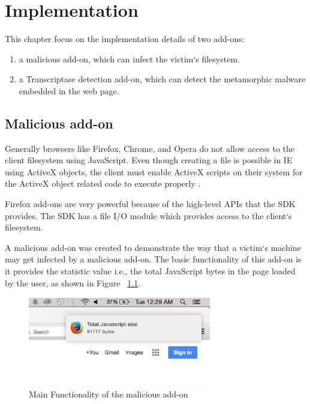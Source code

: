 \chapter{Implementation}

This chapter focus on the implementation details of two add-ons:
\begin{enumerate}
\item a malicious add-on, which can infect the victim`s filesystem.
\item a Transcriptase detection add-on, which can detect the metamorphic malware embedded in the web page.
\end{enumerate}

\section{Malicious add-on}

Generally browsers like Firefox, Chrome, and Opera do not allow access to the client filesystem using JavaScript. Even though creating a file is possible in IE using ActiveX objects, the client must enable ActiveX scripts on their system for the ActiveX object related code to execute properly \cite{bib17}. 

Firefox add-ons are very powerful because of the high-level APIs that the SDK provides. The SDK has a file I/O module which provides access to the client`s filesystem.

A malicious add-on was created to demonstrate the way that a victim`s machine may get infected by a malicious add-on. The basic functionality of this add-on is it provides the statistic value i.e., the total JavaScript bytes in the page loaded by the user, as shown in Figure ~\ref{fig:maliciousaddon}.

\begin{figure}
    \centering    
    \includegraphics[width=8cm, height=3.9cm]{maliciousaddon.png}
    \caption[Main Functionality of the malicious add-on]{Main Functionality of the malicious add-on}
    \label{fig:maliciousaddon}
\end{figure}

